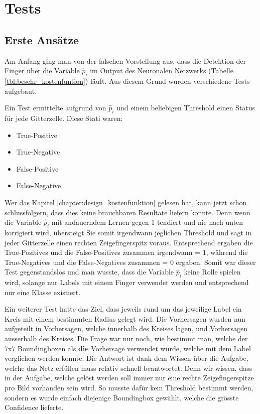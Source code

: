 \newpage
\section{Tests} 
\label{chapter:tests}
\subsection{Erste Ansätze}
Am Anfang ging man von der falschen Vorstellung aus, dass die Detektion der Finger über die Variable $\hat{p}_i$ im Output des Neuronalen Netzwerks (Tabelle \ref{tbl:beschr_kostenfuntion}) läuft. 
Aus diesem Grund wurden verschiedene Tests aufgebaut.

Ein Test ermittelte aufgrund von $\hat{p}_i$ und einem beliebigen Threshold einen Status für jede Gitterzelle. Diese Stati waren: 

\begin{itemize}
\item \grqq{}True-Positive\grqq{}
\item \grqq{}True-Negative\grqq{}
\item \grqq{}False-Positive\grqq{}
\item \grqq{}False-Negative\grqq{}
\end{itemize}

Wer das Kapitel \ref{chapter:design_kostenfunktion} gelesen hat, kann jetzt schon schlussfolgern, dass dies keine brauchbaren Resultate liefern konnte.
Denn wenn die Variable $\hat{p}_i$ mit andauerndem Lernen gegen 1 tendiert und nie nach unten korrigiert wird, übersteigt Sie somit irgendwann jeglichen Threshold und sagt in jeder Gitterzelle einen rechten Zeigefingerspitz voraus. 
Entsprechend ergaben die \grqq{}True-Positives\grqq{} und die \grqq{}False-Positives\grqq{} zusammen irgendwann = 1, während die \grqq{}True-Negatives\grqq{} und die \grqq{}False-Negatives\grqq{} zusammen = 0 ergaben.
Somit war dieser Test gegenstandslos und man wusste, dass die Variable $\hat{p}_i$ keine Rolle spielen wird, solange nur Labels mit einem Finger verwendet werden und entsprechend nur eine Klasse existiert.

Ein weiterer Test hatte das Ziel, dass jeweils rund um das jeweilige Label ein Kreis mit einem bestimmten Radius gelegt wird.
Die Vorhersagen wurden nun aufgeteilt in Vorhersagen, welche innerhalb des Kreises lagen, und Vorhersagen ausserhalb des Kreises.
Die Frage war nur noch, wie bestimmt man, welche der 7x7 Boundingboxen als \textbf{die} Vorhersage verwendet wurde, welche mit dem Label verglichen werden konnte.
Die Antwort ist dank dem Wissen über die Aufgabe, welche das Netz erfüllen muss relativ schnell beantwortet.
Denn wir wissen, dass in der Aufgabe, welche gelöst werden soll immer nur eine rechte Zeigefingerspitze pro Bild vorhanden sein wird.
So musste dafür kein Threshold bestimmt werden, sondern es wurde einfach diejenige Boundingbox gewählt, welche die grösste Confidence lieferte.

